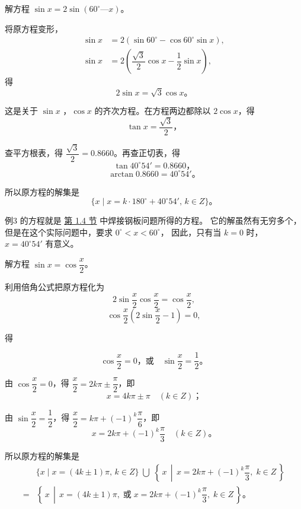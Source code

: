 \liti 解方程 $\sin x = 2\sin(60^\circ — x)$。

\jie 将原方程变形，
\begin{align*}
    \sin x &= 2(\sin 60^\circ - \cos 60^\circ \sin x),\\
    \sin x &= 2\left( \dfrac{\sqrt{3}}{2} \cos x - \dfrac{1}{2} \sin x \right),
\end{align*}
得
$$ 2\sin x = \sqrt{3} \cos x \text{。} $$

这是关于 $\sin x$ ，$\cos x$ 的齐次方程。在方程两边都除以 $2\cos x$，得
$$ \tan x = \dfrac{\sqrt{3}}{2} \text{，}$$

查平方根表，得 $\dfrac{\sqrt{3}}{2} = 0.8660$。再查正切表，得
$$ \tan 40^\circ 54' = 0.8660 \text{，}$$
$$ \arctan 0.8660 = 40^\circ 54' \text{。}$$

所以原方程的解集是
$$ \{ x \mid x = k \cdot 180^\circ + 40^\circ 54', \, k \in Z \} \text{。}$$

例3 的方程就是 \hyperref[subsec:1-4]{第 1.4 节} 中焊接钢板问题所得的方程。
它的解虽然有无穷多个，但是在这个实际问题中，要求 $0^\circ < x < 60^\circ$，
因此，只有当 $k = 0$ 时， $x = 40^\circ 54'$ 有意义。

\liti 解方程 $\sin x = \cos \dfrac{x}{2}$。

\jie 利用倍角公式把原方程化为
$$ 2\sin\dfrac{x}{2} \cos\dfrac{x}{2} = \cos\dfrac{x}{2}, $$
$$ \cos\dfrac{x}{2} \left( 2\sin\dfrac{x}{2} - 1 \right) = 0, $$

得
\begin{minipage}[t]{0.9\textwidth}
    \vspace{-1.7em}$$\cos\dfrac{x}{2} = 0  \text{，或} \quad \sin\dfrac{x}{2} = \dfrac{1}{2} \text{。}$$
\end{minipage}

由 $\cos\dfrac{x}{2} = 0$，得 $\dfrac{x}{2} = 2k\pi \pm \dfrac{\pi}{2}$，即
$$ x = 4k\pi \pm \pi \quad (k \in Z) \text{；}$$

由 $\sin\dfrac{x}{2} = \dfrac{1}{2}$，得 $\dfrac{x}{2} = k\pi + (-1)^k \dfrac{\pi}{6}$，即
$$ x = 2k\pi + (-1)^k \dfrac{\pi}{3} \quad (k \in Z) \text{。} $$

所以原方程的解集是
\begin{align*}
    & \{ x \mid x = (4k \pm 1)\pi ,\, k \in Z \} \;\bigcup\; \left\{\, x \,\middle|\, x = 2k\pi + (-1)^k \dfrac{\pi}{3} ,\; k \in Z \,\right\} \\
   = & \left\{\, x \,\middle|\, x = (4k \pm 1)\pi, \;\text{或}\; x = 2k\pi + (-1)^k \dfrac{\pi}{3} ,\; k \in Z \,\right\} \text{。}
\end{align*}

